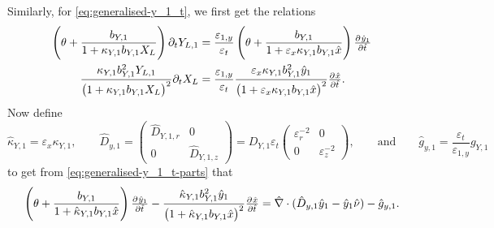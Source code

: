 \documentclass[11pt]{article}
\begin{document}
Similarly, for \eqref{eq:generalised-y_1_t}, we first get the relations
\begin{subequations}
\label{eq:generalised-y_1_t-parts}
\begin{align}
    \left(\theta + \frac{b_{Y,1}}{1 + \kappa_{Y,1} b_{Y,1} X_L}\right) \partial_t Y_{L,1} 
    &= 
    \frac{\varepsilon_{1,y}}{\varepsilon_t} \left( \theta + \frac{b_{Y,1}}{1 + \varepsilon_{x} \kappa_{Y,1} b_{Y,1} \hat{x} } \right)  \pd{\hat{y}_1}{\hat{t}}
    \\
    \frac{ \kappa_{Y,1} b_{Y,1}^2 Y_{L,1}}{\big(1 + \kappa_{Y,1} b_{Y,1} X_L\big)^2} \partial_t X_L
    &=
    \frac{\varepsilon_{1,y}}{\varepsilon_t}
    \frac{ \varepsilon_x  \kappa_{Y,1} b_{Y,1}^2 \hat{y}_{1}}{\big(1 + \varepsilon_x \kappa_{Y,1} b_{Y,1} \hat{x} \big)^2}
    \pd{\hat{x}}{\hat{t}}.
\end{align}
\end{subequations}
Now define
\[
    \hat{\kappa}_{Y,1} = \varepsilon_{x} \kappa_{Y,1},
    \qquad
    \hat{D}_{y,1} = 
    \begin{pmatrix}
         \hat{D}_{Y,1,r} & 0 
         \\
        0 &  \hat{D}_{Y,1,z}
    \end{pmatrix}
    =
    D_{Y,1} \varepsilon_t
    \begin{pmatrix}
         \varepsilon_r^{-2} & 0 
         \\
        0 &  \varepsilon_z^{-2}
    \end{pmatrix},
    \qquad\text{and}\qquad
    \hat{g}_{y,1} = \frac{\varepsilon_t}{\varepsilon_{1,y}} g_{Y,1}
\]
to get from \eqref{eq:generalised-y_1_t-parts} that
\begin{equation}
    \left( \theta + \frac{b_{Y,1}}{1 + \hat{\kappa}_{Y,1} b_{Y,1} \hat{x} } \right)  \pd{\hat{y}_1}{\hat{t}}
    -
    \frac{ \hat{\kappa}_{Y,1} b_{Y,1}^2 \hat{y}_{1}}{\big(1 + \hat{\kappa}_{Y,1} b_{Y,1} \hat{x} \big)^2}
    \pd{\hat{x}}{\hat{t}}
    = \hat{\nabla} \cdot (\hat{D}_{y,1} \hat{y}_1 - \hat{y}_1 \hat{\nu}) - \hat{g}_{y,1}.
\end{equation}
\end{document}

